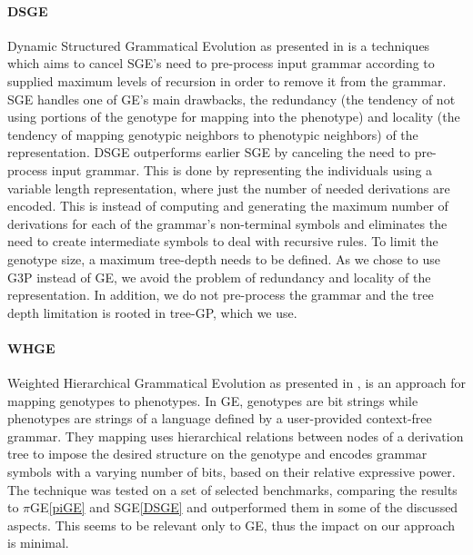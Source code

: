 \documentclass[dvipsnames,format=sigconf,anonymous=true,review=true]{acmart}
\begin{document}
\paragraph{DSGE}
\label{DSGE}
Dynamic Structured Grammatical Evolution as presented in \cite{Lorenco2018Structured} is a techniques which aims to cancel SGE's need to pre-process input grammar according to supplied maximum levels of recursion in order to remove it from the grammar. SGE handles one of GE's main drawbacks, the redundancy (the tendency of not using portions of the genotype for mapping
into the phenotype) and locality (the tendency of mapping genotypic neighbors to
phenotypic neighbors) of the representation. DSGE outperforms earlier SGE by canceling the need to pre-process input grammar. This is done by representing the individuals using a variable length representation, where just the number of needed derivations are encoded. This is instead of computing and generating the maximum number of derivations for each of the grammar’s non-terminal symbols and eliminates the need to create intermediate symbols to deal with recursive rules. To limit the genotype size, a maximum tree-depth needs to be defined.
As we chose to use G3P instead of GE, we avoid the problem of redundancy and locality of the representation. In addition, we do not pre-process the grammar and the tree depth limitation is rooted in tree-GP, which we use.

\paragraph{WHGE}
Weighted Hierarchical Grammatical Evolution as presented in \cite{Bartoli2018Weighted}, is an approach for mapping genotypes to phenotypes. In GE, genotypes are bit strings while phenotypes are strings of a language
defined by a user-provided context-free grammar. They mapping uses hierarchical relations between nodes of a derivation tree to impose the desired structure on the genotype and encodes grammar symbols with a varying number of bits, based on their relative expressive power. The technique was tested on a set of selected benchmarks, comparing the results to $\pi$GE\autoref{piGE} and SGE\autoref{DSGE} and outperformed them in some of the discussed aspects.
This seems to be relevant only to GE, thus the impact on our approach is minimal.
\end{document}
